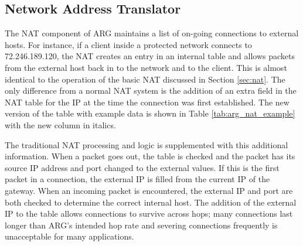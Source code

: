 \subsection{Network Address Translator}
\label{sec:arg_nat}
\par The \ac{NAT} component of \ac{ARG} maintains a list of on-going connections to external hosts. For instance, if a client inside a protected network connects to 72.246.189.120, the \ac{NAT} creates an entry in an internal table and allows packets from the external host back in to the network and to the client. This is almost identical to the operation of the basic \ac{NAT} discussed in Section \ref{sec:nat}. The only difference from a normal \ac{NAT} system is the addition of an extra field in the \ac{NAT} table for the \ac{IP} at the time the connection was first established. The new version of the table with example data is shown in Table \ref{tab:arg_nat_example} with the new column in italics.

\begin{table}
\caption{\ac{ARG} \ac{NAT} table example}
\label{tab:arg_nat_example}
\centering
\noindent{}
\end{table}

\par The traditional \ac{NAT} processing and logic is supplemented with this additional information. When a packet goes out, the table is checked and the packet has its source \ac{IP} address and port changed to the external values. If this is the first packet in a connection, the external IP is filled from the current \ac{IP} of the gateway. When an incoming packet is encountered, the external IP and port are both checked to determine the correct internal host. The addition of the external IP to the table allows connections to survive across hops; many connections last longer than \ac{ARG}'s intended hop rate and severing connections frequently is unacceptable for many applications. 

